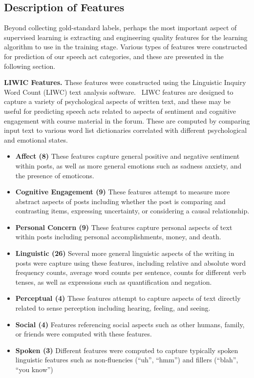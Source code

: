 \documentclass[twoside]{article}
\begin{document}
\subsection{Description of Features}\label{sec:features}
Beyond collecting gold-standard labels, perhaps the most important aspect of supervised learning is extracting and engineering quality features for the learning algorithm to use in the training stage. Various types of features were constructed for prediction of our speech act categories, and these are presented in the following section. 
\par
\textbf{LIWIC Features.} These features were constructed using the Linguistic Inquiry Word Count (LIWC) text analysis software.~\cite{tausczik2010psychological} LIWC features are designed to capture a variety of psychological aspects of written text, and these may be useful for predicting speech acts related to aspects of sentiment and cognitive engagement with course material in the forum. These are computed by comparing input text to various word list dictionaries correlated with different psychological and emotional states.
\begin{itemize}[noitemsep,nolistsep]
\item{\textbf{Affect (8)} These features capture general positive and negative sentiment within posts, as well as more general emotions such as sadness anxiety, and the presence of emoticons.}
\item{\textbf{Cognitive Engagement (9)} These features attempt to measure more abstract aspects of posts including whether the post is comparing and contrasting items, expressing uncertainty, or considering a causal relationship.}
\item{\textbf{Personal Concern (9)} These features capture personal aspects of text within posts including personal accomplishments, money, and death.}
\item{\textbf{Linguistic (26)} Several more general linguistic aspects of the writing in posts were capture using these features, including relative and absolute word frequency counts, average word counts per sentence, counts for different verb tenses, as well as expressions such as quantification and negation.}
\item{\textbf{Perceptual (4)} These features attempt to capture aspects of text directly related to sense perception including hearing, feeling, and seeing.}
\item{\textbf{Social (4)} Features referencing social aspects such as other humans, family, or friends were computed with these features.}
\item{\textbf{Spoken (3)} Different features were computed to capture typically spoken linguistic features such as non-fluencies (``uh'', ``hmm'') and fillers (``blah'', ``you know'')}
\end{itemize}
\end{document}
